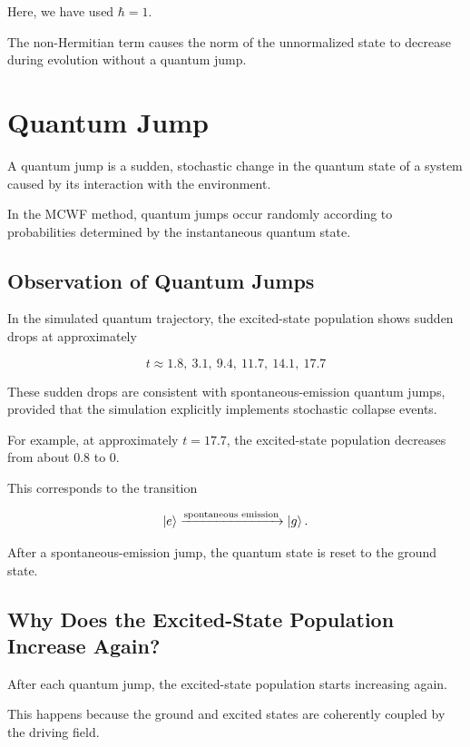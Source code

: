 \documentclass[12pt,a4paper]{report}
\begin{document}
Here, we have used $\hbar=1$.

The non-Hermitian term causes the norm of the
unnormalized state to decrease during evolution
without a quantum jump.

\section{Quantum Jump}

A quantum jump is a sudden, stochastic change in the
quantum state of a system caused by its interaction
with the environment.

In the MCWF method, quantum jumps occur randomly
according to probabilities determined by the
instantaneous quantum state.

\subsection{Observation of Quantum Jumps}

In the simulated quantum trajectory, the excited-state
population shows sudden drops at approximately

\begin{equation}
\boxed{
t\approx
1.8,\ 3.1,\ 9.4,\ 11.7,\ 14.1,\ 17.7
}
\end{equation}

These sudden drops are consistent with spontaneous-emission
quantum jumps, provided that the simulation explicitly
implements stochastic collapse events.

For example, at approximately $t=17.7$, the excited-state
population decreases from about $0.8$ to $0$.

This corresponds to the transition

\begin{equation}
\ket{e}
\xrightarrow{\text{spontaneous emission}}
\ket{g}.
\end{equation}

After a spontaneous-emission jump, the quantum state
is reset to the ground state.

\subsection{Why Does the Excited-State Population Increase Again?}

After each quantum jump, the excited-state population
starts increasing again.

This happens because the ground and excited states
are coherently coupled by the driving field.
\end{document}
